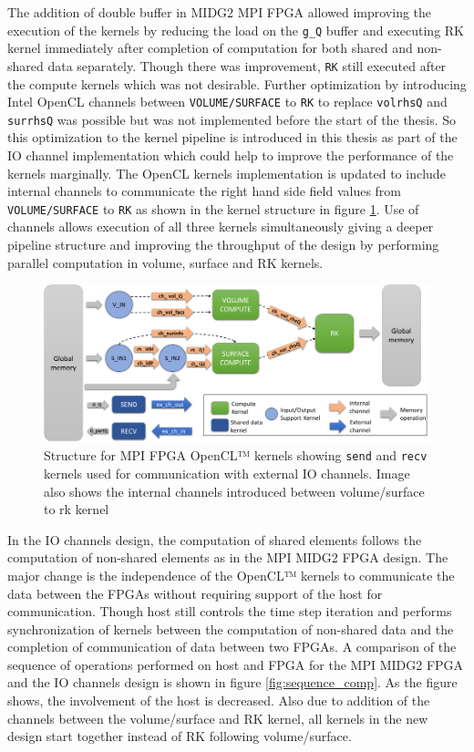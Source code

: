 The addition of double buffer in MIDG2 MPI FPGA allowed improving the execution of the kernels
by reducing the load on the \texttt{g\_Q} buffer and executing RK kernel immediately after completion
of computation for both shared and non-shared data separately. Though there was improvement,
\texttt{RK} still executed after the compute kernels which was not desirable. Further optimization
by introducing Intel OpenCL channels between \texttt{VOLUME/SURFACE} to \texttt{RK} to replace
\texttt{volrhsQ} and \texttt{surrhsQ} was possible but was not implemented before the start of the thesis.
So this optimization to the kernel pipeline is introduced in this thesis as part of the IO channel implementation
which could help to improve the performance of the kernels marginally.
The OpenCL kernels implementation is updated to include internal channels to
communicate the right hand side field values
from \texttt{VOLUME/SURFACE} to \texttt{RK} as shown in the kernel structure
in figure \ref{fig:iochan_kernstruc}. Use of channels allows execution of all three
kernels simultaneously giving a deeper pipeline structure and improving the throughput
of the design by performing parallel computation in volume, surface and RK kernels.

\begin{figure}[h]%
    \centering
    \includegraphics[width=1.0\textwidth]{images/iochan_kernstruc}
    \caption{Structure for MPI FPGA OpenCL™ kernels showing \texttt{send} and \texttt{recv}
    kernels used for communication with external IO channels. Image also shows the internal
    channels introduced between volume/surface to rk kernel}
    \label{fig:iochan_kernstruc}
\end{figure}

In the IO channels design, the computation of shared elements follows the computation of
non-shared elements as in the MPI MIDG2 FPGA design. The major change is the independence of the OpenCL™ kernels to
communicate the data between the FPGAs without requiring support of the host for
communication. Though host still controls the time step iteration and performs synchronization of kernels between
the computation of non-shared data and the completion of communication of data between two FPGAs.
A comparison of the sequence of operations performed on host and FPGA for the MPI MIDG2 FPGA and
the IO channels design is shown in figure \ref{fig:sequence_comp}. As the figure shows,
the involvement of the host is decreased. Also due to addition of the channels between
the volume/surface and RK kernel, all kernels in the new design start together instead
of RK following volume/surface.


